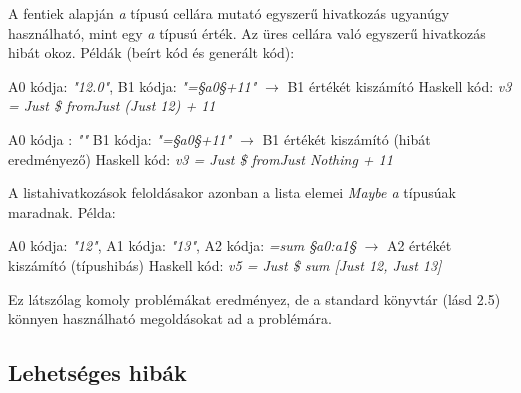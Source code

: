A fentiek alapján \textit{a} típusú cellára mutató egyszerű hivatkozás ugyanúgy használható, mint egy \textit{a} típusú érték. Az üres cellára való egyszerű hivatkozás hibát okoz. Példák (beírt kód és generált kód):
\begin{compactenum}
	\item A0 kódja: \textit{"12.0"}, B1 kódja: \textit{"=§a0§+11"} $\rightarrow$ B1 értékét kiszámító Haskell kód: \textit{v3 = Just \$ fromJust (Just 12) + 11}
	\item A0 kódja : \textit{""} B1 kódja: \textit{"=§a0§+11"} $\rightarrow$ B1 értékét kiszámító (hibát eredményező) Haskell kód: \textit{v3 = Just \$ fromJust Nothing + 11}
\end{compactenum}

A listahivatkozások feloldásakor azonban a lista elemei \textit{Maybe a} típusúak maradnak. Példa:

A0 kódja: \textit{"12"}, A1 kódja: \textit{"13"}, A2 kódja: \textit{=sum §a0:a1§} $\rightarrow$ A2 értékét kiszámító (típushibás) Haskell kód: \textit{v5 = Just \$ sum [Just 12, Just 13]}

Ez látszólag komoly problémákat eredményez, de a standard könyvtár (lásd 2.5) könnyen használható megoldásokat ad a problémára.

\subsection{Lehetséges hibák}

